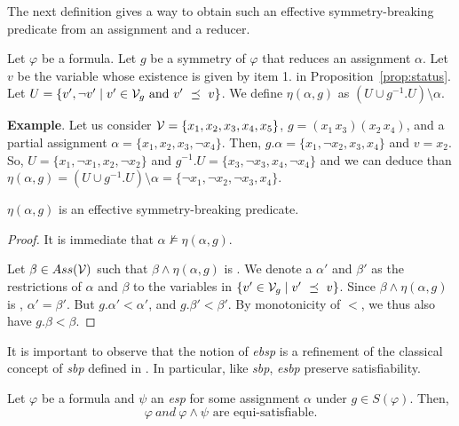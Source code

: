 The next definition gives a way to obtain such an effective symmetry-breaking predicate from an assignment and a reducer.

\begin{definition}
	\label{def:eta}
	Let $\varphi$ be a formula.
	Let $g$ be a symmetry of $\varphi$ that reduces an assignment $\alpha$.
	Let $v$ be the variable whose existence is given by item 1. in Proposition~\ref{prop:status}.
	Let $U = \{ v', \neg v' \mid v' \in \mathcal{V}_g \text{ and } v'~\preceq~v\}$.
	We define $\eta(\alpha, g)$ as $(U \cup g^{-1}.U) \setminus \alpha$.
\end{definition}

\textbf{Example}. Let us consider $\mathcal{V} = \{x_1, x_2, x_3, x_4, x_5\}$, $g =
(x_1\,x_3)(x_2\,x_4)$, and a partial assignment $\alpha = \{x_1, x_2,
x_3, \neg x_4\}$. Then, $g.\alpha = \{x_1, \neg x_2, x_3, x_4\}$ and $v = x_2$.
So, $U = \{x_1, \neg x_1, x_2, \neg x_2\}$ and $g^{-1}.U = \{x_3, \neg x_3,
x_4, \neg x_4\}$ and we can deduce than $\eta(\alpha, g) = (U \cup g^{-1}.U)
\setminus \alpha = \{\neg x_1, \neg x_2, \neg x_3, x_4\}$.

\begin{proposition}
	\label{prop:eta}
	$\eta(\alpha, g)$ is an effective symmetry-breaking predicate.
\end{proposition}
\begin{proof}
	It is immediate that $\alpha \not\models \eta(\alpha, g)$.
	
	Let $\beta \in Ass(\mathcal{V})$ such that $\beta \wedge \eta(\alpha, g)$ is \unsat. We denote a $\alpha'$
	and $\beta'$ as the restrictions of $\alpha$ and $\beta$ to the variables in $\{ v' \in
	\mathcal{V}_g \mid v'~\preceq~v \}$. Since $\beta \wedge \eta(\alpha, g)$ is \unsat, $\alpha' = \beta'$.
	But $g.\alpha' < \alpha'$, and $g.\beta' < \beta'$. By monotonicity of $<$, we thus also have
	$g.\beta < \beta$. \end{proof}

\medskip\noindent It is important to observe that the notion of \textit{ebsp}
is a refinement of the classical concept of \textit{sbp} defined in \cite{aloul06}. In particular, like \textit{sbp}, \textit{esbp} preserve satisfiability.

\begin{theorem}
	Let $\varphi$ be a formula and $\psi$ an \textit{esp} for some assignment $\alpha$ under $g \in S(\varphi)$. Then,
	$$\varphi~and ~\varphi \wedge \psi \text{ are equi-satisfiable}.$$
\end{theorem}

